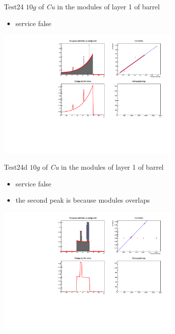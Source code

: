 \documentclass[pdftex, 11pt]{beamer}
\begin{document}
\begin{frame}
  \begin{block}{Test24}
    \alert{$10 g$} of \emph{Cu} in the modules of layer 1 of barrel
    \begin{itemize}
    \item \alert{service} false
    \end{itemize}
  \end{block}
  \begin{center}
    \includegraphics[width=9cm]{img/test24.pdf}
  \end{center}
\end{frame}

\begin{frame}
  \begin{block}{Test24d}
    \alert{$10 g$} of \emph{Cu} in the modules of layer 1 of barrel
    \begin{itemize}
    \item \alert{service} false
    \item the second peak is because modules overlaps
    \end{itemize}
  \end{block}
  \begin{center}
    \includegraphics[width=9cm]{img/test24d.pdf}
  \end{center}
\end{frame}
\end{document}
